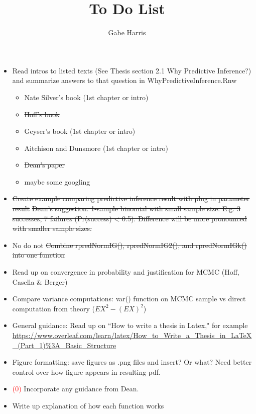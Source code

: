 \documentclass[12pt, a4paper]{article}
\begin{document}
% 
% 





\title{To Do List}
\author{\Large Gabe Harris}
\maketitle

\begin{itemize}
  \item Read intros to listed texts (See Thesis section 2.1 Why Predictive Inference?) and summarize answers to that question in WhyPredictiveInference.Rnw
    \begin{itemize}
      \item Nate Silver's book (1st chapter or intro)
      \item \sout{Hoff's book}
      \item Geyser's book (1st chapter or intro)
      \item Aitchison and Dunsmore (1st chapter or intro)
      \item \sout{Dean's paper}
      \item maybe some googling
    \end{itemize}
  \item \sout{Create example comparing predictive inference result with plug in parameter result}
    \subitem \sout{Dean's suggestion:  1-sample binomial with small sample size.  E.g. 3 successes, 7 failures (Pr(success) < 0.5).  Difference will be more pronounced with smaller sample sizes.}
  \item No do not \sout{Combine rpredNormIG(), rpredNormIG2(), and rpredNormIGk() into one function}
  \item Read up on convergence in probability and justification for MCMC (Hoff, Casella \& Berger)
  \item Compare variance computations: var() function on MCMC sample vs direct computation from theory ($EX^2 - (EX)^2$)
  \item General guidance:  Read up on ``How to write a thesis in Latex," for example \url{https://www.overleaf.com/learn/latex/How_to_Write_a_Thesis_in_LaTeX_(Part_1)%3A_Basic_Structure}
  \item Figure formatting:  save figures as .png files and insert?  Or what?  Need better control over how figure appears in resulting pdf.
  \item \textcolor{red}{(0)} Incorporate any guidance from Dean.
  \item Write up explanation of how each function works
\end{itemize}
\end{document}
